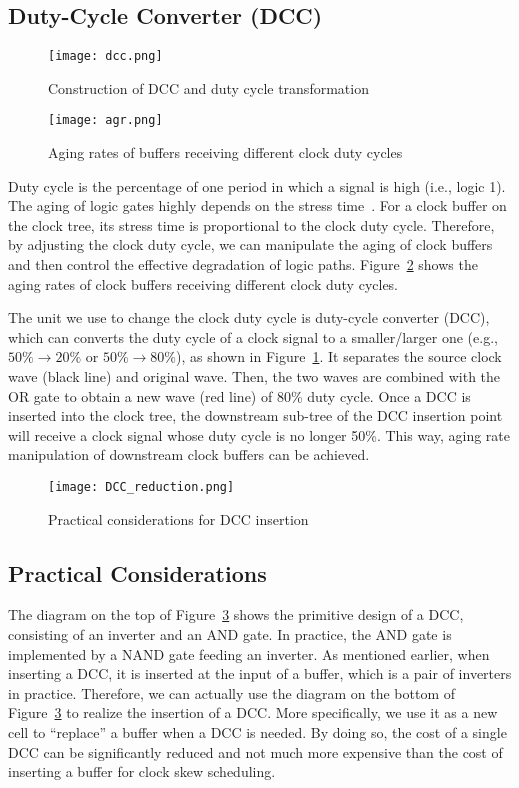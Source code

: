 \subsection{Duty-Cycle Converter (DCC)}
\begin{figure}
    \centering
    \texttt{[image: dcc.png]}
    \caption{Construction of DCC and duty cycle transformation}
    \label{fig:dcc}
\end{figure}

\begin{figure}
    \centering
    \texttt{[image: agr.png]}
    \caption{Aging rates of buffers receiving different clock duty cycles}
    \label{fig:agr}
\end{figure}

Duty cycle is the percentage of one period in which a signal is high (i.e., logic 1). The aging of logic gates highly depends on the stress time~\cite{wang2010impact}. For a clock buffer on the clock tree, its stress time is proportional to the clock duty cycle. Therefore, by adjusting the clock duty cycle, we can manipulate the aging of clock buffers and then control the effective degradation of logic paths. Figure~\ref{fig:agr} shows the aging rates of clock buffers receiving different clock duty cycles. 

The unit we use to change the clock duty cycle is duty-cycle converter (DCC), which can converts the duty cycle of a clock signal to a smaller/larger one (e.g., $50\% \rightarrow 20\%$ or $50\% \rightarrow 80\%$), as shown in Figure~\ref{fig:dcc}. It separates the source clock wave (black line) and original wave. Then, the two waves are combined with the OR gate to obtain a new wave (red line) of 80\% duty cycle. Once a DCC is inserted into the clock tree, the downstream sub-tree of the DCC insertion point will receive a clock signal whose duty cycle is no longer 50\%. This way, aging rate manipulation of downstream clock buffers can be achieved.


\begin{figure}
    \centering
    \texttt{[image: DCC\_reduction.png]}
    \caption{Practical considerations for DCC insertion}
    \label{fig:dccreduc}
\end{figure}

\subsection{Practical Considerations}
\label{subsec:tpc}
The diagram on the top of Figure~\ref{fig:dccreduc} shows the primitive design of a DCC, consisting of an inverter and an AND gate. In practice, the AND gate is implemented by a NAND gate feeding an inverter. As mentioned earlier, when inserting a DCC, it is inserted at the input of a buffer, which is a pair of inverters in practice. Therefore, we can actually use the diagram on the bottom of Figure~\ref{fig:dccreduc} to realize the insertion of a DCC. More specifically, we use it as a new cell to \enquote{replace} a buffer when a DCC is needed. By doing so, the cost of a single DCC can be significantly reduced and not much more expensive than the cost of inserting a buffer for clock skew scheduling. 
